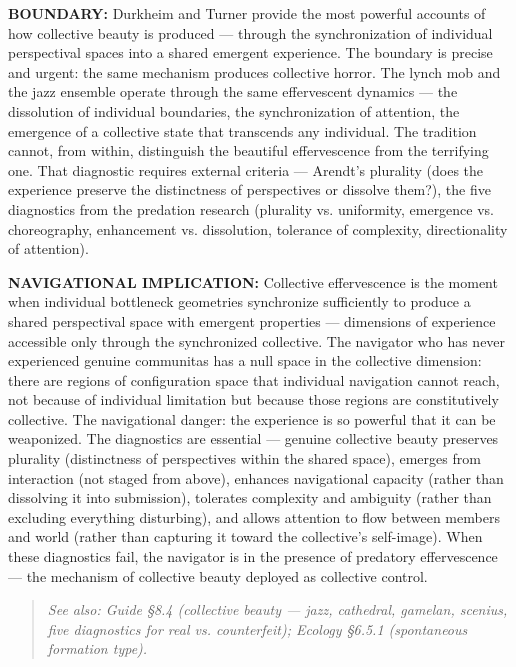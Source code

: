 \textbf{BOUNDARY:} Durkheim and Turner provide the most powerful accounts of how collective beauty is produced — through the synchronization of individual perspectival spaces into a shared emergent experience. The boundary is precise and urgent: the same mechanism produces collective horror. The lynch mob and the jazz ensemble operate through the same effervescent dynamics — the dissolution of individual boundaries, the synchronization of attention, the emergence of a collective state that transcends any individual. The tradition cannot, from within, distinguish the beautiful effervescence from the terrifying one. That diagnostic requires external criteria — Arendt's plurality (does the experience preserve the distinctness of perspectives or dissolve them?), the five diagnostics from the predation research (plurality vs. uniformity, emergence vs. choreography, enhancement vs. dissolution, tolerance of complexity, directionality of attention).


\textbf{NAVIGATIONAL IMPLICATION:} Collective effervescence is the moment when individual bottleneck geometries synchronize sufficiently to produce a shared perspectival space with emergent properties — dimensions of experience accessible only through the synchronized collective. The navigator who has never experienced genuine communitas has a null space in the collective dimension: there are regions of configuration space that individual navigation cannot reach, not because of individual limitation but because those regions are constitutively collective. The navigational danger: the experience is so powerful that it can be weaponized. The diagnostics are essential — genuine collective beauty preserves plurality (distinctness of perspectives within the shared space), emerges from interaction (not staged from above), enhances navigational capacity (rather than dissolving it into submission), tolerates complexity and ambiguity (rather than excluding everything disturbing), and allows attention to flow between members and world (rather than capturing it toward the collective's self-image). When these diagnostics fail, the navigator is in the presence of predatory effervescence — the mechanism of collective beauty deployed as collective control.


\begin{quote}
\itshape
\textit{See also: Guide §8.4 (collective beauty — jazz, cathedral, gamelan, scenius, five diagnostics for real vs. counterfeit); Ecology §6.5.1 (spontaneous formation type).}
\end{quote}


\bigskip\noindent\makebox[\textwidth]{\color{rulegray}\rule{5cm}{0.3pt}}\bigskip
